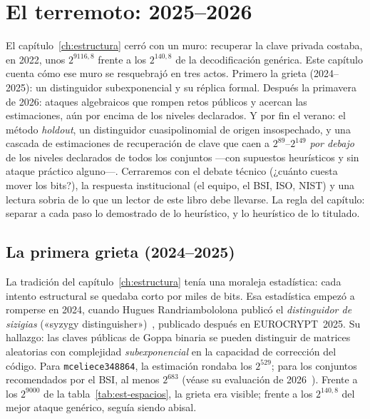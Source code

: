 \chapter{El terremoto: 2025--2026}\label{ch:2026}

\begin{roadmap}
El capítulo~\ref{ch:estructura} cerró con un muro: recuperar la clave
privada costaba, en 2022, unos $2^{9116{,}8}$ frente a los
$2^{140{,}8}$ de la decodificación genérica. Este capítulo cuenta cómo
ese muro se resquebrajó en tres actos. Primero la grieta
(2024--2025): un distinguidor subexponencial y su réplica formal.
Después la primavera de 2026: ataques algebraicos que rompen retos
públicos y acercan las estimaciones, aún por encima de los niveles
declarados. Y por fin el verano: el método \emph{holdout}, un
distinguidor cuasipolinomial de origen insospechado, y una cascada de
estimaciones de recuperación de clave que caen a $2^{89}$--$2^{149}$
\emph{por debajo} de los niveles declarados de todos los conjuntos
---con supuestos heurísticos y sin ataque práctico alguno---. Cerraremos
con el debate técnico (¿cuánto cuesta mover los bits?), la respuesta
institucional (el equipo, el BSI, ISO, NIST) y una lectura sobria de
lo que un lector de este libro debe llevarse. La regla del capítulo:
separar a cada paso lo demostrado de lo heurístico, y lo heurístico de
lo titulado.
\end{roadmap}

\section{La primera grieta (2024--2025)}\label{sec:2026-grieta}

La tradición del capítulo~\ref{ch:estructura} tenía una moraleja
estadística: cada intento estructural se quedaba corto por miles de
bits. Esa estadística empezó a romperse en 2024, cuando Hugues
Randriambololona publicó el \emph{distinguidor de sizigias}
(«syzygy distinguisher»)~\cite{randriam2024}, publicado después en
EUROCRYPT~2025. Su hallazgo: las claves públicas de Goppa binaria se
pueden distinguir de matrices aleatorias con complejidad
\emph{subexponencial} en la capacidad de corrección del código. Para
\texttt{mceliece348864}, la estimación rondaba los $2^{529}$; para
los conjuntos recomendados por el BSI, al menos $2^{683}$ (véase su
evaluación de 2026~\cite{bsi2026}). Frente a los $2^{9000}$ de la
tabla~\ref{tab:est-espacios}, la grieta era visible; frente a los
$2^{140{,}8}$ del mejor ataque genérico, seguía siendo abisal.

